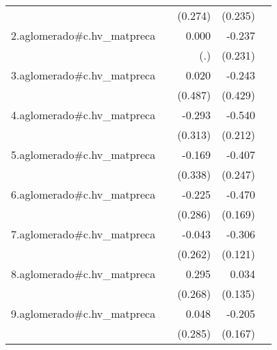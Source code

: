 {\begin{longtable}{l*{4}{D{.}{.}{-1}}}
            &                     &     (0.274)         &     (0.235)         &                     \\
\addlinespace
2.aglomerado#c.hv\_matpreca&                     &       0.000         &      -0.237         &                     \\
            &                     &         (.)         &     (0.231)         &                     \\
\addlinespace
3.aglomerado#c.hv\_matpreca&                     &       0.020         &      -0.243         &                     \\
            &                     &     (0.487)         &     (0.429)         &                     \\
\addlinespace
4.aglomerado#c.hv\_matpreca&                     &      -0.293         &      -0.540\sym{*}  &                     \\
            &                     &     (0.313)         &     (0.212)         &                     \\
\addlinespace
5.aglomerado#c.hv\_matpreca&                     &      -0.169         &      -0.407         &                     \\
            &                     &     (0.338)         &     (0.247)         &                     \\
\addlinespace
6.aglomerado#c.hv\_matpreca&                     &      -0.225         &      -0.470\sym{**} &                     \\
            &                     &     (0.286)         &     (0.169)         &                     \\
\addlinespace
7.aglomerado#c.hv\_matpreca&                     &      -0.043         &      -0.306\sym{*}  &                     \\
            &                     &     (0.262)         &     (0.121)         &                     \\
\addlinespace
8.aglomerado#c.hv\_matpreca&                     &       0.295         &       0.034         &                     \\
            &                     &     (0.268)         &     (0.135)         &                     \\
\addlinespace
9.aglomerado#c.hv\_matpreca&                     &       0.048         &      -0.205         &                     \\
            &                     &     (0.285)         &     (0.167)         &                     \\

\end{longtable}}
